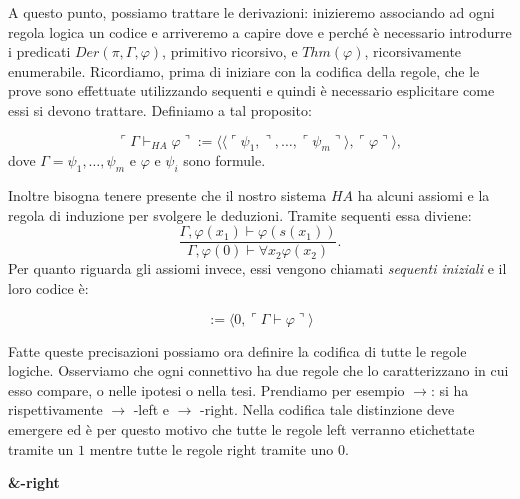 A questo punto, possiamo trattare le derivazioni: inizieremo associando ad ogni regola logica un codice e arriveremo a capire dove e perch\'e \`e necessario introdurre i predicati $Der(\pi,\Gamma,\varphi)$, primitivo ricorsivo, e $Thm(\varphi)$, ricorsivamente enumerabile.
Ricordiamo, prima di iniziare con la codifica della regole, che le prove sono effettuate utilizzando sequenti e quindi \`e necessario esplicitare come essi si devono trattare. Definiamo a tal proposito:

\begin{displaymath}
\ulcorner \Gamma\vdash_{HA} \varphi \urcorner :=  \langle \langle \ulcorner \psi_1, \urcorner,  \ldots ,  \ulcorner \psi_m \urcorner \rangle ,  \ulcorner \varphi \urcorner \rangle ,
\end{displaymath}
dove $\Gamma = \psi_1,\ldots,\psi_m$ e $\varphi$ e $\psi_i$ sono formule.

Inoltre bisogna tenere presente che il nostro sistema $HA$ ha alcuni assiomi e la regola di induzione per svolgere le deduzioni. Tramite sequenti essa diviene:
\begin{displaymath}
\frac{\Gamma, \varphi(x_1) \vdash \varphi(s(x_1))}{\Gamma, \varphi(0)\vdash \forall x_2 \varphi(x_2)}.
\end{displaymath}
Per quanto riguarda gli assiomi invece, essi vengono chiamati \emph{sequenti iniziali} e il loro codice \`e:

\begin{displaymath}
[ \Gamma\vdash \varphi ] :=  \langle 0,  \ulcorner \Gamma\vdash \varphi \urcorner  \rangle
\end{displaymath}

Fatte queste precisazioni possiamo ora definire la codifica di tutte le regole logiche. Osserviamo che ogni connettivo ha due regole che lo caratterizzano in cui esso compare, o nelle ipotesi o nella tesi. Prendiamo per esempio $\rightarrow$: si ha rispettivamente $\rightarrow$ -left e $\rightarrow$ -right. Nella codifica tale distinzione deve emergere ed \`e per questo motivo che tutte le regole left verranno etichettate tramite un $1$ mentre tutte le regole right tramite uno $0$.

\vspace{0.5cm}
\textbf{\&-right}

